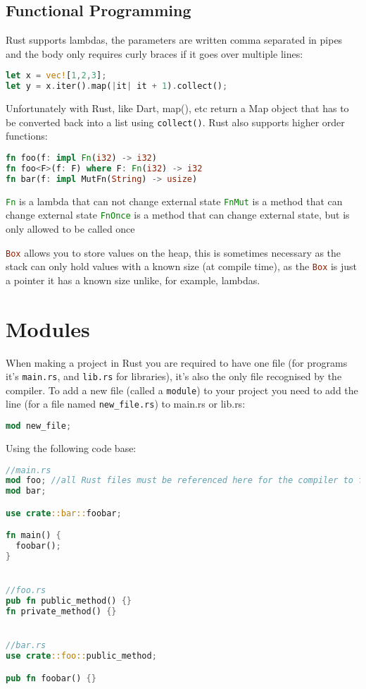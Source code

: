 \documentclass[a4paper,11pt]{article}
\begin{document}
\subsection{Functional Programming}

Rust supports lambdas, the parameters are written comma separated in pipes and the body only requires curly braces if it goes over multiple lines:

\begin{lstlisting}[language=Rust,frame=single]
let x = vec![1,2,3]; 
let y = x.iter().map(|it| it + 1).collect();
\end{lstlisting}
Unfortunately with Rust, like Dart, map(), etc return a Map object that has to be converted back into a list using \lstinline[language=Rust]{collect()}.
\newline
Rust also supports higher order functions:
\begin{lstlisting}[language=Rust,frame=single]
fn foo(f: impl Fn(i32) -> i32)
fn foo<F>(f: F) where F: Fn(i32) -> i32
fn bar(f: impl MutFn(String) -> usize)
\end{lstlisting}

\lstinline[language=Rust]{Fn} is a lambda that can not change external state
\newline
\lstinline[language=Rust]{FnMut} is a method that can change external state
\newline
\lstinline[language=Rust]{FnOnce} is a method that can change external state, but is only allowed to be called once

\lstinline[language=Rust]{Box} allows you to store values on the heap, this is sometimes necessary as the stack can only hold values with a known size (at compile time), as the \lstinline[language=Rust]{Box} is just a pointer it has a known size unlike, for example, lambdas.
\newpage
\section{Modules}
When making a project in Rust you are required to have one file (for programs it's \lstinline{main.rs}, and \lstinline{lib.rs} for libraries), it's also the only file recognised by the compiler. To add a new file (called a \lstinline{module}) to your project you need to add the line (for a file named \lstinline{new_file.rs}) to main.rs or lib.rs:
\begin{lstlisting}[language=Rust,frame=single]
mod new_file;
\end{lstlisting}

Using the following code base:
\begin{lstlisting}[language=Rust,frame=single]
//main.rs 
mod foo; //all Rust files must be referenced here for the compiler to find them
mod bar;

use crate::bar::foobar;

fn main() {
  foobar();
}


//foo.rs
pub fn public_method() {}
fn private_method() {}


//bar.rs
use crate::foo::public_method;

pub fn foobar() {}
\end{lstlisting}
\end{document}
